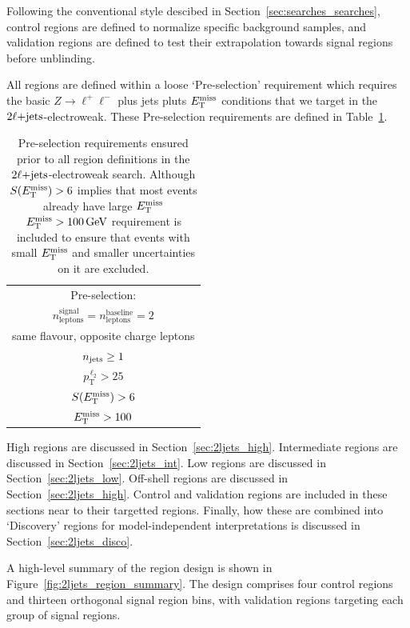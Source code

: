 Following the conventional style descibed in
Section~\ref{sec:searches_searches},
control regions are defined to normalize specific background samples,
and validation regions are defined to test their extrapolation towards
signal regions before unblinding.

All regions are defined within a loose `Pre-selection' requirement which
requires the basic $Z\rightarrow \ell^+\ell^-$ plus jets pluts $\met$
conditions that we target in the $\twoljets$-electroweak.
These Pre-selection requirements are defined in Table~\ref{tab:2ljets_presel}.

\begin{table}[tp]
\centering
\begin{tabular}{c}
Pre-selection:
\\[1em]
$n_\mathrm{leptons}^\mathrm{signal} = n_\mathrm{leptons}^\mathrm{baseline} = 2$
\\[0.5em]
same flavour, opposite charge leptons
\\[0.5em]
$\njet \geq 1$
\\[0.5em]
$p_\mathrm{T}^{\,\ell_2} > 25$
\\[0.5em]
$\metsig > 6$
\\[0.5em]
$\met > 100$
\end{tabular}
\caption[%
Pre-selection requirements ensured prior to all region definitions in the
$\twoljets$-electroweak search
]{%
Pre-selection requirements ensured prior to all region definitions in the
$\twoljets$-electroweak search.
Although $\metsig > 6$ implies that most events already have large $\met$
$\met > 100\,\eV[G]$ requirement is included to ensure that events with small
$\met$ and smaller uncertainties on it are excluded.
}
\label{tab:2ljets_presel}
\end{table}

High regions are discussed in Section~\ref{sec:2ljets_high}.
Intermediate regions are discussed in Section~\ref{sec:2ljets_int}.
Low regions are discussed in Section~\ref{sec:2ljets_low}.
Off-shell regions are discussed in Section~\ref{sec:2ljets_high}.
Control and validation regions are included in these sections near to their
targetted regions.
Finally, how these are combined into `Discovery' regions for
model-independent interpretations is discussed in
Section~\ref{sec:2ljets_disco}.

A high-level summary of the region design is shown in
Figure~\ref{fig:2ljets_region_summary}.
The design comprises four control regions and thirteen orthogonal signal region
bins, with validation regions targeting each group of signal regions.


